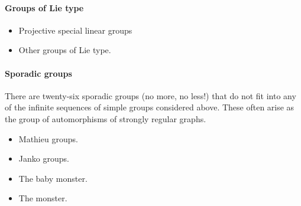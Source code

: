\documentclass[12pt]{article}
\theoremstyle{definition}
\theoremstyle{definition}
\theoremstyle{definition}
\begin{document}
\paragraph{Groups of Lie type}
\begin{itemize}
\item
Projective special linear groups

\item
Other groups of Lie type.

\end{itemize}

\paragraph{Sporadic groups}
There are twenty-six sporadic groups (no more, no less!) that do not fit into any of the infinite sequences of simple groups considered above.  These often arise as the group of automorphisms of strongly regular graphs.
\begin{itemize}

\item
Mathieu groups.  

\item 
Janko groups.

\item
The baby monster.

\item
The monster.
\end{itemize}
\end{document}
